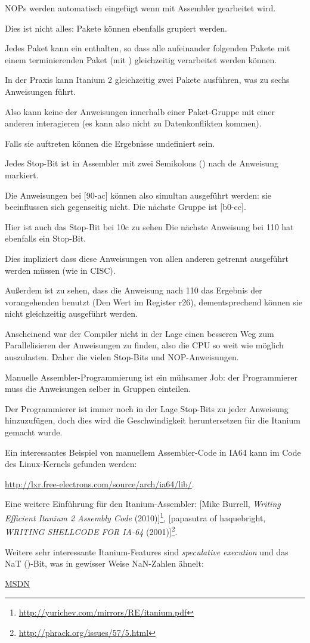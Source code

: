 \ac{NOP}s werden automatisch eingefügt wenn mit Assembler gearbeitet wird.

Dies ist nicht alles: Pakete können ebenfalls grupiert werden.

Jedes Paket kann ein   enthalten, so dass alle aufeinander folgenden
Pakete mit einem terminierenden Paket (mit ) gleichzeitig verarbeitet
werden können.

In der Praxis kann Itanium 2 gleichzeitig zwei Pakete ausführen, was zu sechs
Anweisungen führt.

Also kann keine der Anweisungen innerhalb einer Paket-Gruppe mit einer anderen
interagieren (es kann also nicht zu Datenkonflikten kommen).

Falls sie auftreten können die Ergebnisse undefiniert sein.

Jedes Stop-Bit ist in Assembler mit zwei Semikolons (\TT{;;}) nach de Anweisung markiert.

Die Anweisungen bei [90-ac] können also simultan ausgeführt werden: sie beeinflussen
sich gegenseitig nicht. Die nächste Gruppe ist [b0-cc].

Hier ist auch das Stop-Bit bei 10c zu sehen
Die nächste Anweisung bei 110 hat ebenfalls ein Stop-Bit.

Dies impliziert dass diese Anweisungen von allen anderen getrennt ausgeführt werden
müssen (wie in \ac{CISC}).

Außerdem ist zu sehen, dass die Anweisung nach 110 das Ergebnis der vorangehenden
benutzt (Den Wert im Register r26), dementsprechend können sie nicht gleichzeitig
ausgeführt werden.

Anscheinend war der Compiler nicht in der Lage einen besseren Weg zum Parallelisieren
der Anweisungen zu finden, also die \ac{CPU} so weit wie möglich auszulasten. Daher
die vielen Stop-Bits und \ac{NOP}-Anweisungen.

Manuelle Assembler-Programmierung ist ein mühsamer Job: der Programmierer muss
die Anweisungen selber in Gruppen einteilen.

Der Programmierer ist immer noch in der Lage Stop-Bits zu jeder Anweisung hinzuzufügen,
doch dies wird die Geschwindigkeit heruntersetzen für die Itanium gemacht wurde.

Ein interessantes Beispiel von manuellem Assembler-Code in \ac{IA64} kann im Code
des Linux-Kernels gefunden werden:

\url{http://lxr.free-electrons.com/source/arch/ia64/lib/}.

Eine weitere Einführung für den Itanium-Assembler:
[Mike Burrell, \emph{Writing Efficient Itanium 2 Assembly Code} (2010)]\footnote{\AlsoAvailableAs \url{http://yurichev.com/mirrors/RE/itanium.pdf}},
[papasutra of haquebright, \emph{WRITING SHELLCODE FOR IA-64} (2001)]\footnote{\AlsoAvailableAs \url{http://phrack.org/issues/57/5.html}}.

Weitere sehr interessante Itanium-Features sind \emph{speculative execution} und das
NaT ()-Bit, was in gewisser Weise \gls{NaN}-Zahlen ähnelt:

\href{http://blogs.msdn.com/b/oldnewthing/archive/2004/01/19/60162.aspx}{MSDN}
